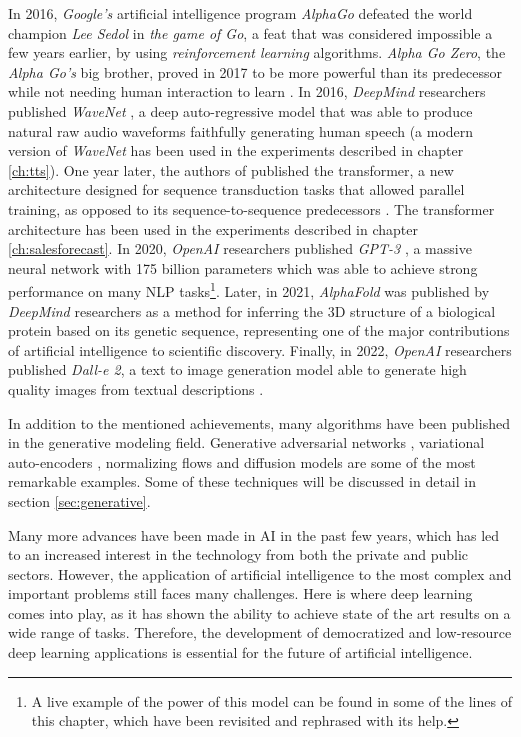 In 2016, \textit{Google's} artificial intelligence program \textit{AlphaGo} \autocite{silver2016} defeated the world champion \textit{Lee Sedol} in \textit{the game of Go}, a feat that was considered impossible a few years earlier, by using \textit{reinforcement learning} algorithms. \textit{Alpha Go Zero}, the \textit{Alpha Go's} big brother, proved in 2017 to be more powerful than its predecessor while not needing human interaction to learn \autocite{Silver2017a, Silver2017b}. In 2016, \textit{DeepMind} researchers published \textit{WaveNet} \autocite{vanderoord2016}, a deep auto-regressive model that was able to produce natural raw audio waveforms faithfully generating human speech (a modern version of \textit{WaveNet} has been used in the experiments described in chapter \ref{ch:tts}). One year later, the authors of \autocite{vaswani2017} published the transformer, a new architecture designed for sequence transduction tasks that allowed parallel training, as opposed to its sequence-to-sequence predecessors \autocite{sutskever2014}. The transformer architecture has been used in the experiments described in chapter \ref{ch:salesforecast}. In 2020, \textit{OpenAI} researchers published \textit{GPT-3} \autocite{brown2020}, a massive neural network with 175 billion parameters which was able to achieve strong performance on many NLP tasks\footnote{A live example of the power of this model can be found in some of the lines of this chapter, which have been revisited and rephrased with its help.}. Later, in 2021, \textit{AlphaFold} was published by \textit{DeepMind} researchers \autocite{Jumper2021} as a method for inferring the 3D structure of a biological protein based on its genetic sequence, representing one of the major contributions of artificial intelligence to scientific discovery. Finally, in 2022, \textit{OpenAI} researchers published \textit{Dall-e 2}, a text to image generation model able to generate high quality images from textual descriptions \autocite{aditya2022}.

In addition to the mentioned achievements, many algorithms have been published in the generative modeling field. Generative adversarial networks \autocite{Goodfellow2014}, variational auto-encoders \autocite{kingma2019}, normalizing flows \autocite{kingma2016, kobyzev} and diffusion models \autocite{Prafulla2021} are some of the most remarkable examples. Some of these techniques will be discussed in detail in section \ref{sec:generative}.

Many more advances have been made in AI in the past few years, which has led to an increased interest in the technology from both the private and public sectors. However, the application of artificial intelligence to the most complex and important problems still faces many challenges. Here is where deep learning comes into play, as it has shown the ability to achieve state of the art results on a wide range of tasks. Therefore, the development of democratized and low-resource deep learning applications is essential for the future of artificial intelligence. 

